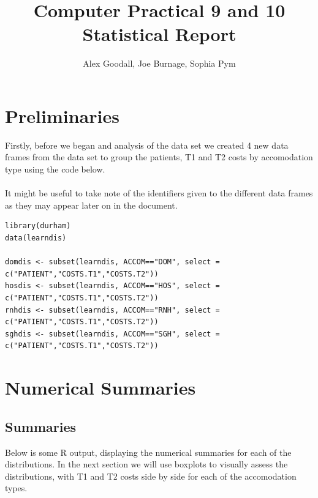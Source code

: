 \documentclass[]{article}
\title{Computer Practical 9 and 10 Statistical Report}
\author{Alex Goodall, Joe Burnage, Sophia Pym}
\begin{document}
\maketitle
\section{Preliminaries}
Firstly, before we began and analysis of the data set we created 4 new data frames from the data set to group the patients, T1 and T2 costs by accomodation type using the code below.
\\
\\
It might be useful to take note of the identifiers given to the different data frames as they may appear later on in the document.
\begin{lstlisting}
library(durham)
data(learndis)

domdis <- subset(learndis, ACCOM=="DOM", select = c("PATIENT","COSTS.T1","COSTS.T2"))
hosdis <- subset(learndis, ACCOM=="HOS", select = c("PATIENT","COSTS.T1","COSTS.T2"))
rnhdis <- subset(learndis, ACCOM=="RNH", select = c("PATIENT","COSTS.T1","COSTS.T2"))
sghdis <- subset(learndis, ACCOM=="SGH", select = c("PATIENT","COSTS.T1","COSTS.T2"))
\end{lstlisting}
\section{Numerical Summaries}
\subsection{Summaries}
Below is some R output, displaying the numerical summaries for each of the distributions. In the next section we will use boxplots to visually assess the distributions, with T1 and T2 costs side by side for each of the accomodation types.

\end{document}
